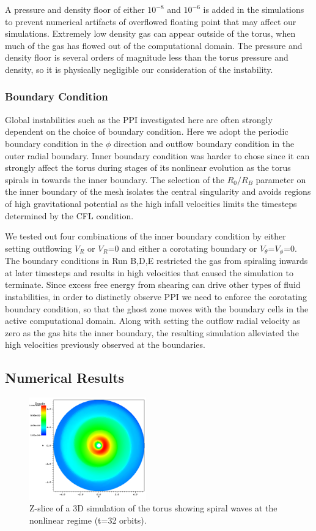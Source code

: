 \documentclass[iop,revtex4]{emulateapj}
\begin{document}
\par A pressure and density floor of either $10^{-8}$ and $10^{-6}$ is added in the simulations to prevent numerical artifacts of overflowed floating point that may affect our simulations. Extremely low density gas can appear outside of the torus, when much of the gas has flowed out of the computational domain. The pressure and density floor is several orders of magnitude less than the torus pressure and density, so it is physically negligible our consideration of the instability.
\subsubsection{Boundary Condition\label{sec:BC}}
\par Global instabilities such as the \ac{PPI} investigated here are often strongly dependent on the choice of boundary condition. Here we adopt the periodic boundary condition in the $\phi$ direction and outflow boundary condition in the outer radial boundary. Inner boundary condition was harder to chose since it can strongly affect the torus during stages of its nonlinear evolution as the torus spirals in towards the inner boundary. The selection of the $R_0/R_B$ parameter on the inner boundary of the mesh isolates the central singularity and avoids regions of high gravitational potential as the high infall velocities limits the timesteps determined by the \ac{CFL} condition. 
\par We tested out four combinations of the inner boundary condition by either setting outflowing $V_R$ or $V_R$=0 and either a corotating boundary or $V_\theta$=$V_\phi$=0. The boundary conditions in Run B,D,E restricted the gas from spiraling inwards at later timesteps and results in high velocities that caused the simulation to terminate. Since excess free energy from shearing can drive other types of fluid instabilities, in order to distinctly observe \ac{PPI} we need to enforce the corotating boundary condition, so that the ghost zone moves with the boundary cells in the active computational domain.  Along with setting the outflow radial velocity as zero as the gas hits the inner boundary, the resulting simulation alleviated the high velocities previously observed at the boundaries. 
\subsection{Numerical Results}
\begin{figure}
\includegraphics[width=0.45\textwidth]{plots/t32_orbit.png}
\caption{Z-slice of a 3D simulation of the torus showing spiral waves at the nonlinear regime (t=32 orbits). }
\label{t32_orbit}
\end{figure}
\end{document}
